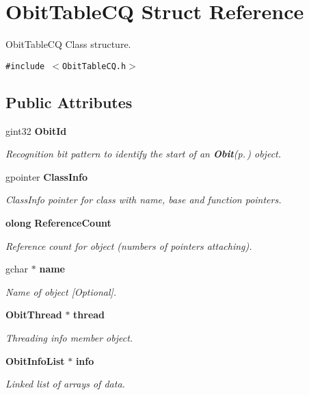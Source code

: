\section{Obit\-Table\-CQ Struct Reference}
\label{structObitTableCQ}
Obit\-Table\-CQ Class structure.  


{\tt \#include $<$Obit\-Table\-CQ.h$>$}

\subsection*{Public Attributes}
\begin{CompactItemize}
\item 
gint32 {\bf Obit\-Id}
\begin{CompactList}\small\item\em Recognition bit pattern to identify the start of an {\bf Obit}{\rm (p.\,\pageref{structObit})} object. \item\end{CompactList}\item 
gpointer {\bf Class\-Info}
\begin{CompactList}\small\item\em Class\-Info pointer for class with name, base and function pointers. \item\end{CompactList}\item 
{\bf olong} {\bf Reference\-Count}
\begin{CompactList}\small\item\em Reference count for object (numbers of pointers attaching). \item\end{CompactList}\item 
gchar $\ast$ {\bf name}
\begin{CompactList}\small\item\em Name of object [Optional]. \item\end{CompactList}\item 
{\bf Obit\-Thread} $\ast$ {\bf thread}
\begin{CompactList}\small\item\em Threading info member object. \item\end{CompactList}\item 
{\bf Obit\-Info\-List} $\ast$ {\bf info}
\begin{CompactList}\small\item\em Linked list of arrays of data. \item\end{CompactList}\item 

\end{CompactItemize}

